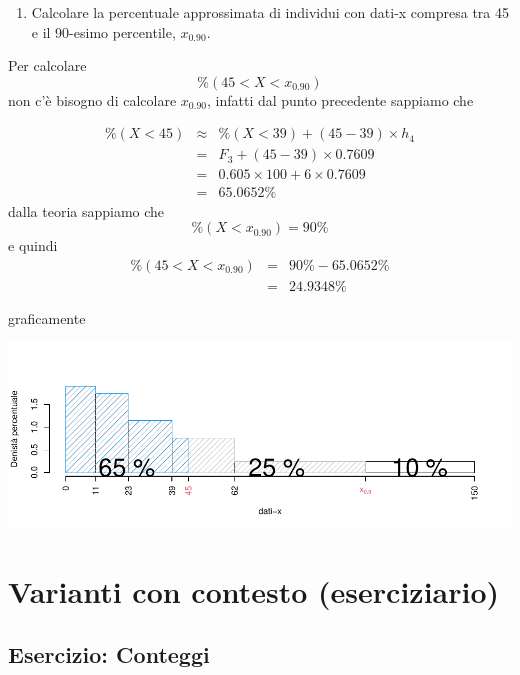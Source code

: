 \documentclass[
  11pt,
]{book}
\providecommand{\tightlist}{%
  \setlength{\itemsep}{0pt}\setlength{\parskip}{0pt}}
\theoremstyle{mytheoremstyle}
\theoremstyle{mydefstyle}
\newenvironment{sol}
  {
  \begin{tcolorbox}[enhanced,breakable,arc=0.1mm,boxrule=1pt,colback=white,colframe=iblue,
  title=\bf \fontfamily{lmss}\selectfont \hspace{.5 cm} Soluzione,drop fuzzy shadow]

}{
\end{tcolorbox}
  }
\begin{document}
\begin{enumerate}
\def\labelenumi{\alph{enumi}.}
\setcounter{enumi}{3}
\tightlist
\item
  Calcolare la percentuale approssimata di individui con dati-x compresa tra 45 e il 90-esimo percentile, \(x_{0.90}\).
\end{enumerate}

\begin{sol}

Per calcolare
\[
\%(45< X < x_{0.90})
\]
non c'è bisogno di calcolare \(x_{0.90}\), infatti dal punto precedente sappiamo che

\begin{eqnarray*}
\%(X<45)   &\approx&  \%(X<39)+(45-39)\times h_4\\
&=& F_3+(45-39)\times 0.7609\\
&=& 0.605\times 100 + 6\times 0.7609\\
&=& 65.0652\%
\end{eqnarray*}
dalla teoria sappiamo che
\[
\%(X<x_{0.90})=90\%
\]
e quindi
\begin{eqnarray*}
\%(45< X < x_{0.90}) &=& 90\%-65.0652\%\\
                     &=& 24.9348\%
\end{eqnarray*}

graficamente

\begin{center}\includegraphics{Esami_passati_con_soluzioni_files/figure-latex/01-descr-13-1} \end{center}

\end{sol}

\section{Varianti con contesto (eserciziario)}\label{varianti-con-contesto-eserciziario}

\subsection{Esercizio: Conteggi}\label{esercizio-conteggi}
\end{document}
